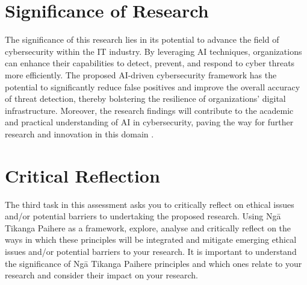 \documentclass[a4paper,man,12pt]{article}
\begin{document}
\section{Significance of Research}

  
  The significance of this research lies in its potential to advance the field of cybersecurity within the IT industry. By leveraging AI techniques, organizations can enhance their capabilities to detect, prevent, and respond to cyber threats more efficiently. The proposed AI-driven cybersecurity framework has the potential to significantly reduce false positives and improve the overall accuracy of threat detection, thereby bolstering the resilience of organizations' digital infrastructure. Moreover, the research findings will contribute to the academic and practical understanding of AI in cybersecurity, paving the way for further research and innovation in this domain \cite{015}.


\section{Critical Reflection}

  
  The third task in this assessment asks you to critically reflect on ethical issues and/or potential barriers to undertaking the proposed research. Using Ngā Tikanga Paihere as a framework, explore, analyse and critically reflect on the ways in which these principles will be integrated and mitigate emerging ethical issues and/or potential barriers to your research. It is important to understand the significance of Ngā Tikanga Paihere principles and which ones relate to your research and consider their impact on your research.
\end{document}
